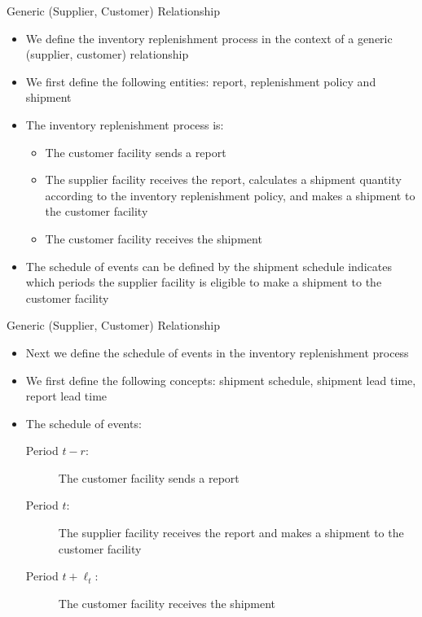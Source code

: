 \documentclass{beamer}
\begin{document}
\begin{frame}{Generic (Supplier, Customer) Relationship}
\begin{itemize}
\item We define the inventory replenishment process
  in the context of a generic (supplier, customer) relationship
\item We first define the following entities:
  report, replenishment policy and shipment
\item The inventory replenishment process is:
    \begin{itemize}
    \item
    The customer facility sends a report
    \item
    The supplier facility receives the report,
    calculates a shipment quantity
    according to the inventory replenishment policy,
    and makes a shipment to the customer facility
    \item
    The customer facility receives the shipment
    \end{itemize}
\item The schedule of events can be defined by
the shipment schedule indicates which periods
the supplier facility is eligible to make a shipment to the customer facility
\end{itemize}
\end{frame}

\begin{frame}{Generic (Supplier, Customer) Relationship}
\begin{itemize}
\item Next we define the schedule of events in the
  inventory replenishment process
\item We first define the following concepts:
  shipment schedule, shipment lead time, report lead time
\item The schedule of events:
    \begin{description}
    \item[Period $t - r$:]
    The customer facility sends a report
    \item[Period $t$:]
    The supplier facility receives the report
    and makes a shipment to the customer facility
    \item[Period $t + \ell_t$:]
    The customer facility receives the shipment
    \end{description}
\end{itemize}
\end{frame}
\end{document}
